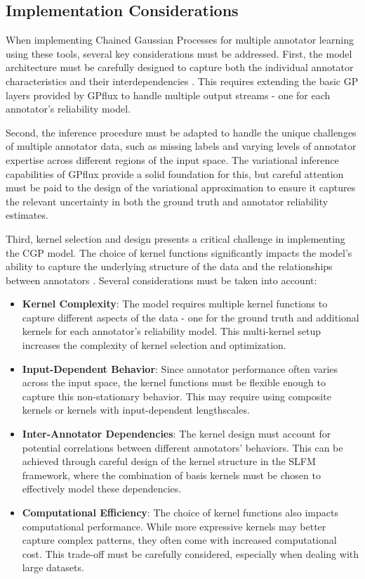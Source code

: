 \subsection{Implementation Considerations}

When implementing Chained Gaussian Processes for multiple annotator
learning using these tools, several key considerations must be
addressed. First, the model architecture must be carefully designed
to capture both the individual annotator characteristics and their
interdependencies \cite{GilEtAlvarez2023CCGPMA}. This requires
extending the basic \gls{GP} layers
provided by GPflux to handle multiple output streams - one for each
annotator's reliability model.

Second, the inference procedure must be adapted to handle the unique
challenges of multiple annotator data, such as missing labels and
varying levels of annotator expertise across different regions of the
input space. The variational inference capabilities of GPflux provide
a solid foundation for this, but careful attention must be paid to
the design of the variational approximation to ensure it captures the
relevant uncertainty in both the ground truth and annotator
reliability estimates.

Third, kernel selection and design presents a critical challenge in
implementing the CGP model. The choice of kernel functions significantly
impacts the model's ability to capture the underlying structure of the
data and the relationships between annotators \cite{RasmussenEtAl2006Chapter9}.
Several considerations must be taken into account:

\begin{itemize}
\item \textbf{Kernel Complexity}: The model requires multiple kernel
functions to capture different aspects of the data - one for the
ground truth and additional kernels for each annotator's reliability
model. This multi-kernel setup increases the complexity of kernel
selection and optimization.

\item \textbf{Input-Dependent Behavior}: Since annotator performance
often varies across the input space, the kernel functions must be
flexible enough to capture this non-stationary behavior. This may
require using composite kernels or kernels with input-dependent
lengthscales.

\item \textbf{Inter-Annotator Dependencies}: The kernel design must
account for potential correlations between different annotators'
behaviors. This can be achieved through careful design of the kernel
structure in the SLFM framework, where the combination of basis
kernels must be chosen to effectively model these dependencies.

\item \textbf{Computational Efficiency}: The choice of kernel
functions also impacts computational performance. While more
expressive kernels may better capture complex patterns, they often
come with increased computational cost. This trade-off must be
carefully considered, especially when dealing with large datasets.
\end{itemize}

